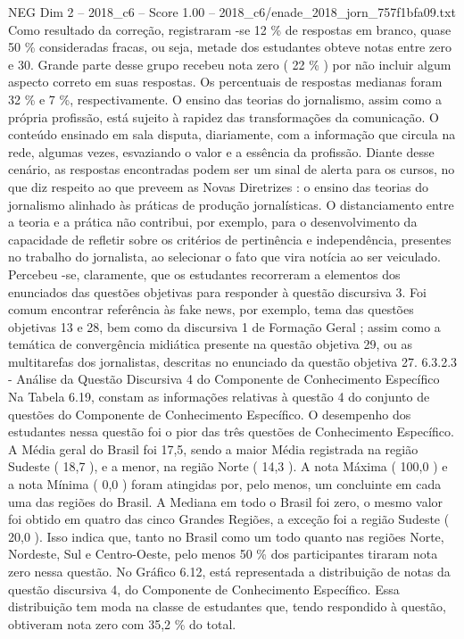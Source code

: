 \begin{textsample}{NEG Dim 2 – 2018\_c6 – Score 1.00 – 2018\_c6/enade\_2018\_jorn\_757f1bfa09.txt}
Como resultado da correção, registraram -se 12 \% de respostas em branco, quase 50 \% consideradas fracas, ou seja, metade dos estudantes obteve notas entre zero e 30.
Grande parte desse grupo recebeu nota zero ( 22 \% ) por não incluir algum aspecto correto em suas respostas.
Os percentuais de respostas medianas foram 32 \% e 7 \%, respectivamente.
O ensino das teorias do jornalismo, assim como a própria profissão, está sujeito à rapidez das transformações da comunicação.
O conteúdo ensinado em sala disputa, diariamente, com a informação que circula na rede, algumas vezes, esvaziando o valor e a essência da profissão.
Diante desse cenário, as respostas encontradas podem ser um sinal de alerta para os cursos, no que diz respeito ao que preveem as Novas Diretrizes : o ensino das teorias do jornalismo alinhado às práticas de produção jornalísticas.
O distanciamento entre a teoria e a prática não contribui, por exemplo, para o desenvolvimento da capacidade de refletir sobre os critérios de pertinência e independência, presentes no trabalho do jornalista, ao selecionar o fato que vira notícia ao ser veiculado.
Percebeu -se, claramente, que os estudantes recorreram a elementos dos enunciados das questões objetivas para responder à questão discursiva 3.
Foi comum encontrar referência às fake news, por exemplo, tema das questões objetivas 13 e 28, bem como da discursiva 1 de Formação Geral ; assim como a temática de convergência midiática presente na questão objetiva 29, ou as multitarefas dos jornalistas, descritas no enunciado da questão objetiva 27. 6.3.2.3 - Análise da Questão Discursiva 4 do Componente de Conhecimento Específico Na Tabela 6.19, constam as informações relativas à questão 4 do conjunto de questões do Componente de Conhecimento Específico.
O desempenho dos estudantes nessa questão foi o pior das três questões de Conhecimento Específico.
A Média geral do Brasil foi 17,5, sendo a maior Média registrada na região Sudeste ( 18,7 ), e a menor, na região Norte ( 14,3 ).
A nota Máxima ( 100,0 ) e a nota Mínima ( 0,0 ) foram atingidas por, pelo menos, um concluinte em cada uma das regiões do Brasil.
A Mediana em todo o Brasil foi zero, o mesmo valor foi obtido em quatro das cinco Grandes Regiões, a exceção foi a região Sudeste ( 20,0 ).
Isso indica que, tanto no Brasil como um todo quanto nas regiões Norte, Nordeste, Sul e Centro-Oeste, pelo menos 50 \% dos participantes tiraram nota zero nessa questão.
No Gráfico 6.12, está representada a distribuição de notas da questão discursiva 4, do Componente de Conhecimento Específico.
Essa distribuição tem moda na classe de estudantes que, tendo respondido à questão, obtiveram nota zero com 35,2 \% do total.

\end{textsample}
